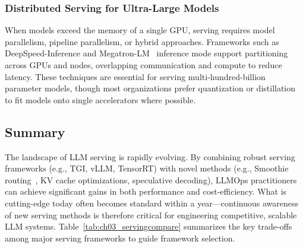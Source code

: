 \subsubsection{Distributed Serving for Ultra-Large Models}
When models exceed the memory of a single GPU, serving requires model parallelism, pipeline parallelism, or hybrid approaches. Frameworks such as DeepSpeed-Inference and Megatron-LM~\cite{megatron_lm_2019} inference mode support partitioning across GPUs and nodes, overlapping communication and compute to reduce latency. These techniques are essential for serving multi-hundred-billion parameter models, though most organizations prefer quantization or distillation to fit models onto single accelerators where possible.

\subsection{Summary}\label{sec:serving-summary}

The landscape of LLM serving is rapidly evolving. By combining robust serving frameworks (e.g., TGI, vLLM, TensorRT) with novel methods (e.g., Smoothie routing~\cite{Guha2024Smoothie}, KV cache optimizations, speculative decoding), LLMOps practitioners can achieve significant gains in both performance and cost-efficiency. What is cutting-edge today often becomes standard within a year—continuous awareness of new serving methods is therefore critical for engineering competitive, scalable LLM systems. Table~\ref{tab:ch03_servingcompare} summarizes the key trade-offs among major serving frameworks to guide framework selection.


